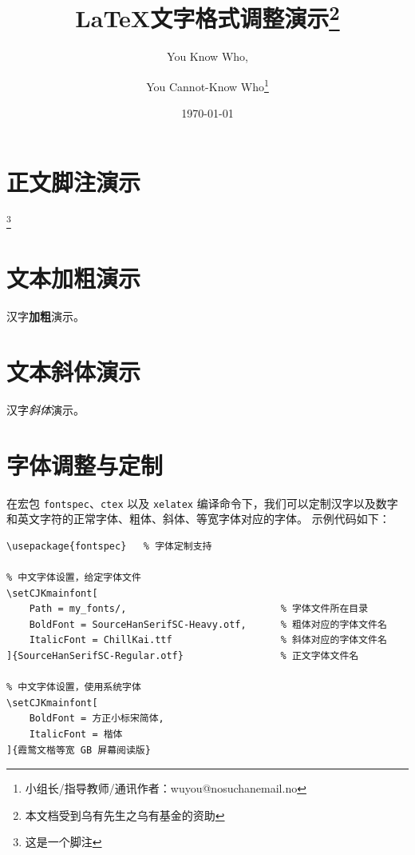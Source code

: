 \documentclass[12pt]{ctexart}   %
\title{\bfseries \LaTeX{}文字格式调整演示\thanks{本文档受到乌有先生之乌有基金的资助}}   %
\author{You Know Who, \and You Cannot-Know Who\thanks{小组长/指导教师/通讯作者：wuyou@nosuchanemail.no}}        %
\date{\today}                   %
\begin{document}
\maketitle
\tableofcontents

\thispagestyle{empty}   %

\newpage



\section{正文脚注演示}

\lipsum[1]\footnote{这是一个脚注}

\section{文本加粗演示}

\textbf{\lipsum[2]}

{\bfseries \lipsum[2]}

汉字{\bfseries 加粗}演示。

\section{文本斜体演示}

\textit{\lipsum[2]}

{\itshape \lipsum[2]}

汉字{\itshape 斜体}演示。

\section{字体调整与定制}

在宏包 \verb|fontspec|、\verb|ctex| 以及 \verb|xelatex| 编译命令下，我们可以定制汉字以及数字和英文字符的正常字体、粗体、斜体、等宽字体对应的字体。
示例代码如下：
\begin{verbatim}
\usepackage{fontspec}   % 字体定制支持

% 中文字体设置，给定字体文件
\setCJKmainfont[
    Path = my_fonts/,                           % 字体文件所在目录
    BoldFont = SourceHanSerifSC-Heavy.otf,      % 粗体对应的字体文件名
    ItalicFont = ChillKai.ttf                   % 斜体对应的字体文件名
]{SourceHanSerifSC-Regular.otf}                 % 正文字体文件名

% 中文字体设置，使用系统字体
\setCJKmainfont[
    BoldFont = 方正小标宋简体, 
    ItalicFont = 楷体
]{霞鹜文楷等宽 GB 屏幕阅读版}
\end{verbatim}
\end{document}
